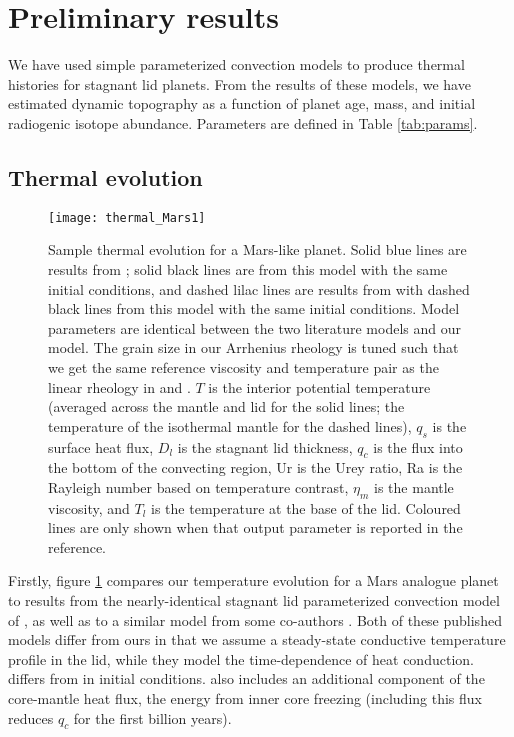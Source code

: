 \section{Preliminary results}\label{sec:results}


We have used simple parameterized convection models to produce thermal histories for stagnant lid planets. From the results of these models, we have estimated dynamic topography as a function of planet age, mass, and initial radiogenic isotope abundance. Parameters are defined in Table \ref{tab:params}.

\subsection{Thermal evolution}\label{sec:thermal}

\begin{figure}
  \centering
  \texttt{[image: thermal\_Mars1]}
\caption{Sample thermal evolution for a Mars-like planet. Solid blue lines are results from \citet{Thiriet2019}; solid black lines are from this model with the same initial conditions, and dashed lilac lines are results from \citet{Breuer2010} with dashed black lines from this model with the same initial conditions. Model parameters are identical between the two literature models and our model. The grain size in our Arrhenius rheology is tuned such that we get the same reference viscosity and temperature pair as the linear rheology in \citet{Thiriet2019} and \citet{Breuer2010}. $T$ is the interior potential temperature (averaged across the mantle and lid for the solid lines; the temperature of the isothermal mantle for the dashed lines), $q_{s}$ is the surface heat flux, $D_l$ is the stagnant lid thickness, $q_{c}$ is the flux into the bottom of the convecting region, Ur is the Urey ratio, Ra is the Rayleigh number based on temperature contrast, $\eta_m$ is the mantle viscosity, and $T_l$ is the temperature at the base of the lid. Coloured lines are only shown when that output parameter is reported in the reference. %
}
\label{fig:thermal}
\end{figure}

Firstly, figure \ref{fig:thermal} compares our temperature evolution for a Mars analogue planet to results from the nearly-identical stagnant lid parameterized convection model of \citet{Thiriet2019}, as well as to a similar model from some co-authors \citep{Breuer2010}. Both of these published models differ from ours in that we assume a steady-state conductive temperature profile in the lid, while they model the time-dependence of heat conduction. \citet{Breuer2010} differs from \citet{Thiriet2019} in initial conditions. \citet{Breuer2010} also includes an additional component of the core-mantle heat flux, the energy from inner core freezing (including this flux reduces $q_c$ for the first billion years). 


